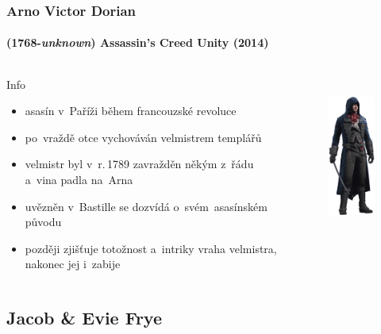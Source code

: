 \documentclass[hyperref={colorlinks, linkcolor=white, urlcolor=green!50!black}]{beamer}
\begin{document}
\begin{frame}\label{arno}
\frametitle{Arno Victor Dorian}
\framesubtitle{(1768-\textit{unknown}) \hfill Assassin's Creed Unity (2014)}
\begin{columns}[c]
	
	\begin{block}{Info}
	\begin{itemize}
		\item asasín v~Paříži během francouzské revoluce
		\item po~vraždě otce vychováván velmistrem templářů
		\item velmistr byl v~r.\,1789 zavražděn někým z~řádu a~vina padla na~Arna
		\item uvězněn v~Bastille se dozvídá o~svém~asasínském původu
		\item později zjišťuje totožnost a~intriky vraha velmistra, nakonec jej i~zabije
	\end{itemize}
	\end{block}
	
	\begin{figure}[h]
		\centering
		\includegraphics[height=200px]{char_arno}
	\end{figure}
	
\end{columns}
\end{frame}

\subsection[Jacob, Evie]{Jacob \& Evie Frye}
\end{document}
